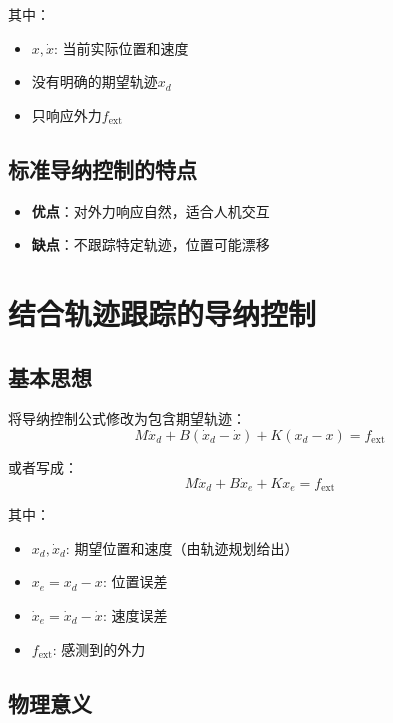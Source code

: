 \documentclass[12pt,a4paper]{article}
\begin{document}
其中：
\begin{itemize}
\item $x, \dot{x}$: 当前实际位置和速度
\item 没有明确的期望轨迹$x_d$
\item 只响应外力$f_{\text{ext}}$
\end{itemize}

\subsection{标准导纳控制的特点}

\begin{itemize}
\item \textbf{优点}：对外力响应自然，适合人机交互
\item \textbf{缺点}：不跟踪特定轨迹，位置可能漂移
\end{itemize}

\section{结合轨迹跟踪的导纳控制}

\subsection{基本思想}

将导纳控制公式修改为包含期望轨迹：
\begin{equation}
M\ddot{x}_d + B(\dot{x}_d - \dot{x}) + K(x_d - x) = f_{\text{ext}} \tag{*}
\end{equation}

或者写成：
\begin{equation}
M\ddot{x}_d + B\dot{x}_e + Kx_e = f_{\text{ext}} \tag{**}
\end{equation}

其中：
\begin{itemize}
\item $x_d, \dot{x}_d$: 期望位置和速度（由轨迹规划给出）
\item $x_e = x_d - x$: 位置误差
\item $\dot{x}_e = \dot{x}_d - \dot{x}$: 速度误差
\item $f_{\text{ext}}$: 感测到的外力
\end{itemize}

\subsection{物理意义}
\end{document}
